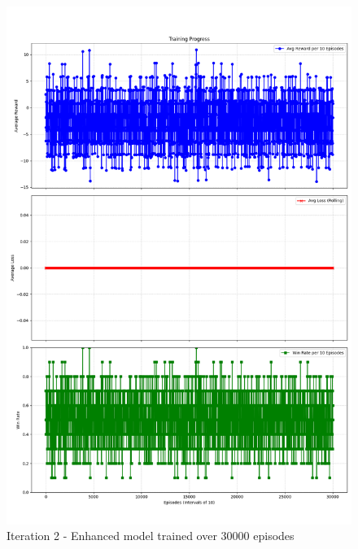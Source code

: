 \begin{figure}[H]
    \includegraphics[width=.8\textwidth]{assets/Iteration-2-graphs.png}
    \caption{Iteration 2 - Enhanced model trained over 30000 episodes}
    \label{fig:iteration-2-graphs}
\end{figure}

\clearpage